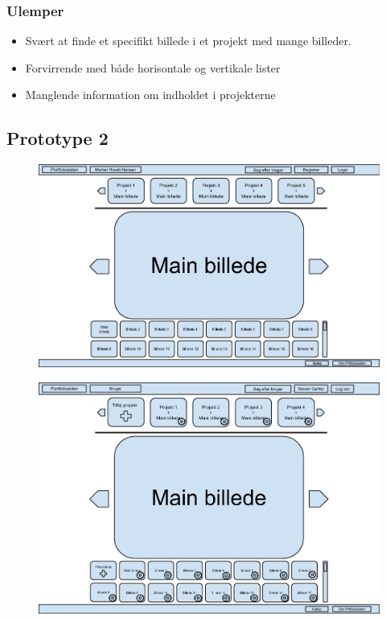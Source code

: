 \documentclass[a4paper,titlepage,fleqn,12pt]{article}
\begin{document}
\subsubsection{Ulemper}
\begin{itemize}
	\item Svært at finde et specifikt billede i et projekt med mange billeder. 
	\item Forvirrende med både horisontale og vertikale lister
	\item Manglende information om indholdet i projekterne
\end{itemize}

\subsection{Prototype 2}

\begin{figure}[H]
	\includegraphics[width=\textwidth]{Prototype_1_not_logged_in.png}
\end{figure}

\begin{figure}[H]
	\includegraphics[width=\textwidth]{Prototype_1_logged_in.png}
\end{figure}
\end{document}
